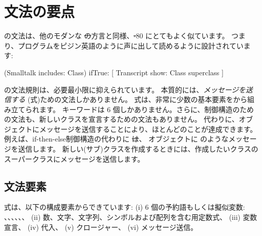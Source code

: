 \documentclass[a4paper,10pt,twoside]{book}
\begin{document}
	\renewcommand{\nnbb}[2]{} %
	\sloppy
\fi
\chapter{文法の要点}



\pharo の文法は、他のモダンな \st の方言と同様、\st-80 にとてもよく似ています。
つまり、プログラムをピジン英語のように声に出して読めるように設計されています:

\begin{code}{}
(Smalltalk includes: Class) ifTrue: [ Transcript show: Class superclass ]
\end{code}

\noindent
\pharo の文法規則は、必要最小限に抑えられています。
本質的には、\emph{メッセージを送信する} (\ie 式)ための文法しかありません。 
式は、非常に少数の基本要素をから組み立てられます。
キーワードは 6 個しかありません。さらに、制御構造のための文法も、新しいクラスを宣言するための文法もありません。
代わりに、オブジェクトにメッセージを送信することにより、ほとんどのことが達成できます。
例えば、if-then-else制御構造の代わりに \st は、 オブジェクトに  のようなメッセージを送信します。
新しい(サブ)クラスを作成するときには、作成したいクラスのスーパークラスにメッセージを送信します。

\section{文法要素}

式は、以下の構成要素からできています:
(i) 6 個の予約語もしくは擬似変数:
、、、、、、
(ii) 数、文字、文字列、シンボルおよび配列を含む用定数式、
(iii) 変数宣言、
(iv) 代入、
(v) クロージャー、
(vi) メッセージ送信。
\end{document}
